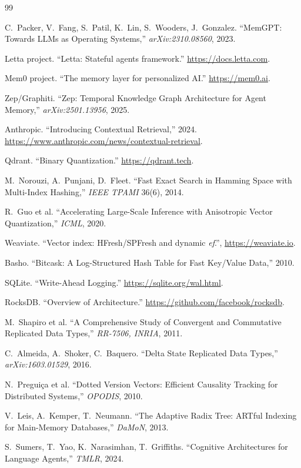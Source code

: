 \documentclass[11pt,twocolumn]{article}
\begin{document}
\begin{thebibliography}{99}

 C.~Packer, V.~Fang, S.~Patil, K.~Lin, S.~Wooders, J.~Gonzalez.
``MemGPT: Towards LLMs as Operating Systems,'' \emph{arXiv:2310.08560}, 2023.

 Letta project. ``Letta: Stateful agents framework.''
\url{https://docs.letta.com}.

 Mem0 project. ``The memory layer for personalized AI.''
\url{https://mem0.ai}.

 Zep/Graphiti. ``Zep: Temporal Knowledge Graph Architecture
for Agent Memory,'' \emph{arXiv:2501.13956}, 2025.

 Anthropic. ``Introducing Contextual Retrieval,'' 2024.
\url{https://www.anthropic.com/news/contextual-retrieval}.

 Qdrant. ``Binary Quantization.'' \url{https://qdrant.tech}.

 M.~Norouzi, A.~Punjani, D.~Fleet. ``Fast Exact Search in Hamming
Space with Multi-Index Hashing,'' \emph{IEEE TPAMI} 36(6), 2014.

 R.~Guo et al. ``Accelerating Large-Scale Inference with
Anisotropic Vector Quantization,'' \emph{ICML}, 2020.

 Weaviate. ``Vector index: HFresh/SPFresh and dynamic
\emph{ef}.'', \url{https://weaviate.io}.

 Basho. ``Bitcask: A Log-Structured Hash Table for Fast
Key/Value Data,'' 2010.

 SQLite. ``Write-Ahead Logging.''
\url{https://sqlite.org/wal.html}.

 RocksDB. ``Overview of Architecture.''
\url{https://github.com/facebook/rocksdb}.

 M.~Shapiro et al. ``A Comprehensive Study of Convergent and
Commutative Replicated Data Types,'' \emph{RR-7506, INRIA}, 2011.

 C.~Almeida, A.~Shoker, C.~Baquero. ``Delta State Replicated
Data Types,'' \emph{arXiv:1603.01529}, 2016.

 N.~Pregui\c{c}a et al. ``Dotted Version Vectors: Efficient
Causality Tracking for Distributed Systems,'' \emph{OPODIS}, 2010.

 V.~Leis, A.~Kemper, T.~Neumann. ``The Adaptive Radix Tree:
ARTful Indexing for Main-Memory Databases,'' \emph{DaMoN}, 2013.

 S.~Sumers, T.~Yao, K.~Narasimhan, T.~Griffiths. ``Cognitive
Architectures for Language Agents,'' \emph{TMLR}, 2024.

\end{thebibliography}
\end{document}
